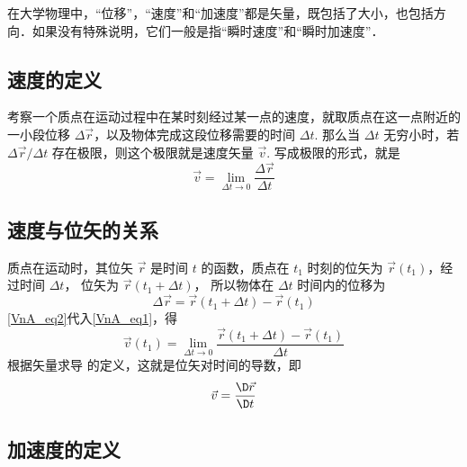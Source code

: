 

在大学物理中，“位移”，“速度”和“加速度”都是矢量，既包括了大小，也包括方向．如果没有特殊说明，它们一般是指“瞬时速度”和“瞬时加速度”．

\subsection{速度的定义}
考察一个质点在运动过程中在某时刻经过某一点的速度，就取质点在这一点附近的一小段位移 $\Delta\vec r$，以及物体完成这段位移需要的时间 $\Delta t$. 那么当 $\Delta t$ 无穷小时，若 $\Delta \vec r/\Delta t$ 存在极限，则这个极限就是速度矢量 $\vec v$. 写成极限的形式，就是
\begin{equation}\label{VnA_eq1}
\vec v = \mathop {\lim }\limits_{\Delta t \to 0} \frac{{\Delta \vec r}}{{\Delta t}}
\end{equation}

\subsection{速度与位矢的关系}

质点在运动时，其位矢 $\vec r$ 是时间 $t$ 的函数，质点在 ${t_1}$ 时刻的位矢为 $\vec r\left( {{t_1}} \right)$，经过时间 $\Delta t$， 位矢为 $\vec r\left( {{t_1} + \Delta t} \right)$， 所以物体在 $\Delta t$ 时间内的位移为
\begin{equation}\label{VnA_eq2}
\Delta \vec r = \vec r\left( {{t_1} + \Delta t} \right) - \vec r\left( {{t_1}} \right)
\end{equation}
\autoref{VnA_eq2}代入\autoref{VnA_eq1}，得
\begin{equation}\label{VnA_eq3}
\vec v(t_1) = \mathop {\lim }\limits_{\Delta t \to 0} \frac{{\vec r\left( {{t_1} + \Delta t} \right) - \vec r\left( {{t_1}} \right)}}{{\Delta t}}
\end{equation}
根据矢量求导 的定义，这就是位矢对时间的导数，即
\begin{equation}
\vec v = \frac{\D \vec r}{\D t}
\end{equation}


\subsection{加速度的定义}

